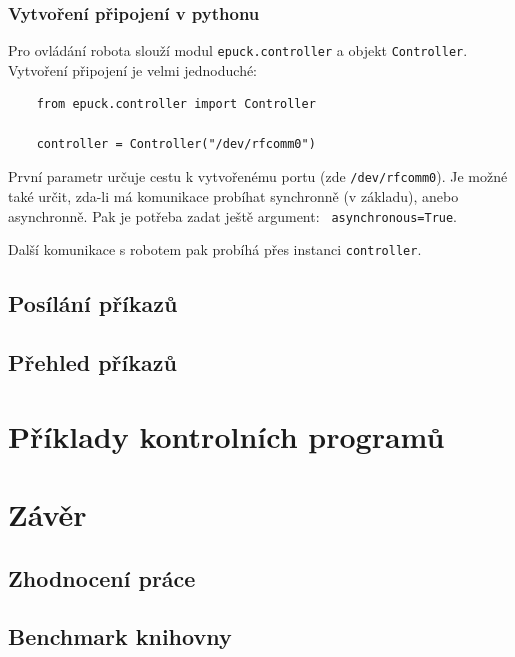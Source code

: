\documentclass[12pt,notitlepage]{report}
\begin{document}
    \subsection{Vytvoření připojení v pythonu}

    Pro ovládání robota slouží modul {\tt epuck.controller} a objekt {\tt Controller}. Vytvoření připojení je velmi jednoduché:
    \begin{verbatim}
    from epuck.controller import Controller

    controller = Controller("/dev/rfcomm0")
    \end{verbatim}
    První parametr určuje cestu k vytvořenému portu (zde {\tt /dev/rfcomm0}).
    Je možné také určit, zda-li má komunikace probíhat synchronně (v základu),
    anebo asynchronně. Pak je potřeba zadat ještě argument: {\tt
    asynchronous=True}.

    Další komunikace s robotem pak probíhá přes instanci {\tt controller}.

    \section{Posílání příkazů}

    \section{Přehled příkazů}

\chapter{Příklady kontrolních programů}

\chapter{Závěr}

    \section{Zhodnocení práce}

    \section{Benchmark knihovny}





\end{document}
